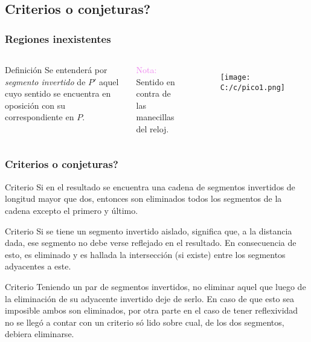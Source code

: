 \documentclass[notes=show]{beamer}
\begin{document}
\subsection{\textquestiondown Criterios o conjeturas?}
\begin{frame}
\frametitle{Regiones inexistentes}

\begin{columns}[6cm]
\column{7cm}


\begin{block}{Definici\'on}
Se entender\'a por \emph{\alert{segmento invertido}} de $P'$ aquel cuyo sentido se encuentra en oposici\'on con su correspondiente en $P$.
\end{block}

 \textcolor{violet}{\newline Nota:} Sentido en contra de las manecillas del reloj.%

\column{5cm}

\begin{figure}[htbp]
	\centering
		\texttt{[image: C:/c/pico1.png]}
\end{figure}

\end{columns}
\transsplithorizontalin[duration=0.4]
\end{frame}
\begin{frame}
\frametitle{\textquestiondown Criterios o conjeturas?}

\begin{block}{Criterio}
\footnotesize{Si en el resultado se encuentra una cadena de segmentos invertidos de
longitud mayor que dos, entonces son eliminados todos los segmentos de la cadena
excepto el primero y \'{u}ltimo. }
\end{block}
\pause
\begin{block}{Criterio}
\footnotesize{Si se tiene un segmento invertido aislado, significa que, a la distancia dada, ese
segmento no debe verse reflejado en el resultado. En consecuencia de esto, es
eliminado y es hallada la intersecci\'{o}n (si existe) entre los segmentos
adyacentes a este. }\end{block}
\pause
\begin{block}{Criterio}
\footnotesize{Teniendo un par de segmentos invertidos, no eliminar aquel que luego de la
eliminaci\'{o}n de su adyacente invertido deje de serlo. En caso de que esto
sea imposible ambos son eliminados, por otra parte en el caso de tener
reflexividad no se lleg\'o a contar con un criterio s\'{o}%
lido sobre cual, de los dos segmentos, debiera eliminarse.}\end{block}

\end{frame}
\end{document}

